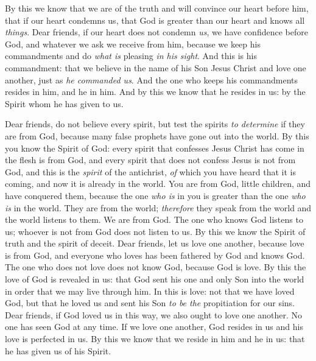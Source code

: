 \begin{biblechapter}
\verse By this we know that we are of the truth and will convince our heart before him,
\verse that if our heart condemns us, that God is greater than our heart and knows all \textit{things}.
\verse Dear friends, if our heart does not condemn \textit{us}, we have confidence before God,
\verse and whatever we ask we receive from him, because we keep his commandments and do \textit{what is} pleasing \textit{in his sight}.
\verse And this is his commandment: that we believe in the name of his Son Jesus Christ and love one another, just as \textit{he commanded us}.
\verse And the one who keeps his commandments resides in him, and he in him. And by this we know that he resides in us: by the Spirit whom he has given to us.
\end{biblechapter}

\begin{biblechapter} %
 Dear friends, do not believe every spirit, but test the spirits \textit{to determine} if they are from God, because many false prophets have gone out into the world.
\verse By this you know the Spirit of God: every spirit that confesses Jesus Christ has come in the flesh is from God,
\verse and every spirit that does not confess Jesus is not from God, and this is the \textit{spirit} of the antichrist, \textit{of} which you have heard that it is coming, and now it is already in the world.
\verse You are from God, little children, and have conquered them, because the one \textit{who is} in you is greater than the one \textit{who is} in the world.
\verse They are from the world; \textit{therefore} they speak from the world and the world listens to them.
\verse We are from God. The one who knows God listens to us; whoever is not from God does not listen to us. By this we know the Spirit of truth and the spirit of deceit.
 Dear friends, let us love one another, because love is from God, and everyone who loves has been fathered by God and knows God.
\verse The one who does not love does not know God, because God is love.
\verse By this the love of God is revealed in us: that God sent his one and only Son into the world in order that we may live through him.
\verse In this is love: not that we have loved God, but that he loved us and sent his Son \textit{to be the} propitiation for our sins.
\verse Dear friends, if God loved us in this way, we also ought to love one another.
\verse No one has seen God at any time. If we love one another, God resides in us and his love is perfected in us.
\verse By this we know that we reside in him and he in us: that he has given us of his Spirit.

\end{biblechapter}
